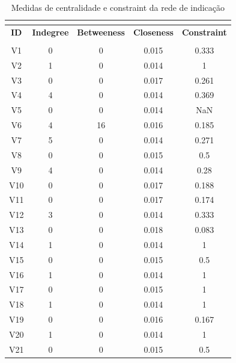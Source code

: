 \documentclass[a4paper, 12pt, openright, oneside, german, french, english, brazil]{abntex2}
\begin{document}
\begin{SingleSpace}
\begin{footnotesize}
\begin{center}
\begin{longtable}{c c c c c}
				\end{longtable}
			\end{center}
		\end{footnotesize}
	\end{SingleSpace}
	
	
		\begin{SingleSpace}
		\begin{footnotesize}
			\begin{center}
				\begin{longtable}{c c c c c}
					\caption{Medidas de centralidade e constraint da rede de indicação}\\
					\label{centralidades:indicacao}\\
					\hline
					\textbf{ID}  & \textbf{Indegree} & \textbf{Betweeness} & \textbf{Closeness} & \textbf{Constraint} \\
					\hline
					\endfirsthead
					\hline
					\endhead
					\hline
					\endfoot
					\hline
					\multicolumn{5}{l}{Fonte: Elaboração do autor}\\
					\endlastfoot
					V1 & 0 & 0 & 0.015 & 0.333 \\ 
					V2 & 1 & 0 & 0.014 & 1 \\ 
					V3 & 0 & 0 & 0.017 & 0.261 \\ 
					V4 & 4 & 0 & 0.014 & 0.369 \\ 
					V5 & 0 & 0 & 0.014 & NaN \\ 
					V6 & 4 & 16 & 0.016 & 0.185 \\ 
					V7 & 5 & 0 & 0.014 & 0.271 \\ 
					V8 & 0 & 0 & 0.015 & 0.5 \\ 
					V9 & 4 & 0 & 0.014 & 0.28 \\ 
					V10 & 0 & 0 & 0.017 & 0.188 \\ 
					V11 & 0 & 0 & 0.017 & 0.174 \\ 
					V12 & 3 & 0 & 0.014 & 0.333 \\ 
					V13 & 0 & 0 & 0.018 & 0.083 \\ 
					V14 & 1 & 0 & 0.014 & 1 \\ 
					V15 & 0 & 0 & 0.015 & 0.5 \\ 
					V16 & 1 & 0 & 0.014 & 1 \\ 
					V17 & 0 & 0 & 0.015 & 1 \\ 
					V18 & 1 & 0 & 0.014 & 1 \\ 
					V19 & 0 & 0 & 0.016 & 0.167 \\ 
					V20 & 1 & 0 & 0.014 & 1 \\ 
					V21 & 0 & 0 & 0.015 & 0.5 \\ 

\end{longtable}
\end{center}
\end{footnotesize}
\end{SingleSpace}
\end{document}
